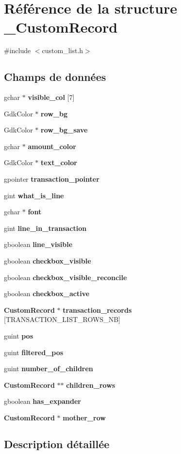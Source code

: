 \section{Référence de la structure \_\-CustomRecord}
\label{struct__CustomRecord}


{\ttfamily \#include $<$custom\_\-list.h$>$}

\subsection*{Champs de données}
\begin{DoxyCompactItemize}
\item 
gchar $\ast$ {\bf visible\_\-col} [7]
\item 
GdkColor $\ast$ {\bf row\_\-bg}
\item 
GdkColor $\ast$ {\bf row\_\-bg\_\-save}
\item 
gchar $\ast$ {\bf amount\_\-color}
\item 
GdkColor $\ast$ {\bf text\_\-color}
\item 
gpointer {\bf transaction\_\-pointer}
\item 
gint {\bf what\_\-is\_\-line}
\item 
gchar $\ast$ {\bf font}
\item 
gint {\bf line\_\-in\_\-transaction}
\item 
gboolean {\bf line\_\-visible}
\item 
gboolean {\bf checkbox\_\-visible}
\item 
gboolean {\bf checkbox\_\-visible\_\-reconcile}
\item 
gboolean {\bf checkbox\_\-active}
\item 
{\bf CustomRecord} $\ast$ {\bf transaction\_\-records} [TRANSACTION\_\-LIST\_\-ROWS\_\-NB]
\item 
guint {\bf pos}
\item 
guint {\bf filtered\_\-pos}
\item 
guint {\bf number\_\-of\_\-children}
\item 
{\bf CustomRecord} $\ast$$\ast$ {\bf children\_\-rows}
\item 
gboolean {\bf has\_\-expander}
\item 
{\bf CustomRecord} $\ast$ {\bf mother\_\-row}
\end{DoxyCompactItemize}


\subsection{Description détaillée}


